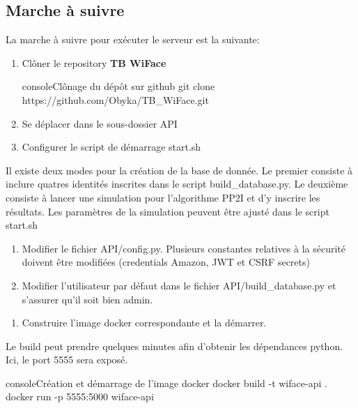 \subsection{Marche à suivre}
La marche à suivre pour exécuter le serveur est la suivante:
\begin{enumerate}
    \item Clôner le repository \textbf{TB WiFace}
    \begin{listingsbox}{console}{Clônage du dépôt sur github}
git clone https://github.com/Obyka/TB_WiFace.git
    \end{listingsbox}
    \item{Se déplacer dans le sous-dossier API}
    \item{Configurer le script de démarrage start.sh}
\end{enumerate}
    Il existe deux modes pour la création de la base de donnée. Le premier
    consiste à inclure quatres identités inscrites dans le script build\_database.py.
    Le deuxième consiste à lancer une simulation pour l'algorithme PP2I et d'y inscrire les résultats.
    Les paramètres de la simulation peuvent être ajusté dans le script start.sh
    
    
\begin{enumerate}[resume]
    \item Modifier le fichier API/config.py. Plusieurs constantes relatives à la sécurité doivent être modifiées (credentials Amazon, JWT et CSRF secrets)
    \item Modifier l'utilisateur par défaut dans le fichier API/build\_database.py et s'assurer qu'il soit bien admin.
\end{enumerate}

\begin{enumerate}[resume]
    \item Construire l'image docker correspondante et la démarrer.
\end{enumerate}

Le build peut prendre quelques minutes afin d'obtenir les dépendances python.
Ici, le port 5555 sera exposé.
\begin{listingsbox}{console}{Création et démarrage de l'image docker}
docker build -t wiface-api .
docker run -p 5555:5000 wiface-api
\end{listingsbox}

